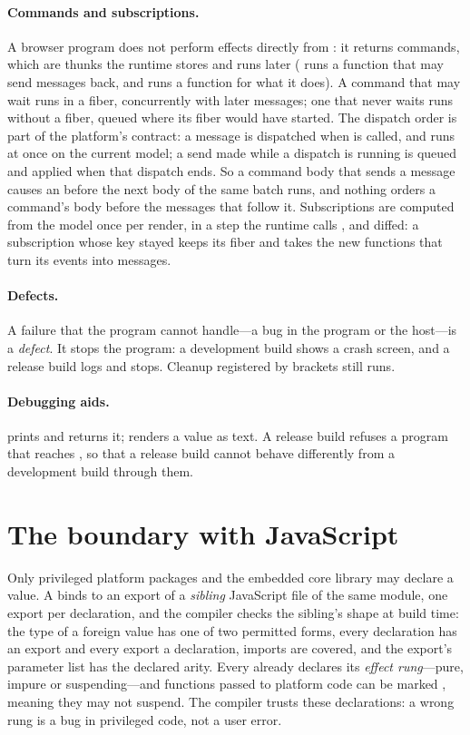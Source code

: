 \paragraph{Commands and subscriptions.} A browser program does not perform effects directly from
: it returns commands, which are thunks the runtime stores and runs later
( runs a function that may send messages back, and  runs a
function for what it does). A command that may wait runs in a fiber, concurrently with later
messages; one that never waits runs without a fiber, queued where its fiber would have started. The
dispatch order is part of the platform's contract: a message is dispatched when  is called,
and  runs at once on the current model; a send made while a dispatch is running is queued
and applied when that dispatch ends. So a command body that sends a message causes an 
before the next body of the same batch runs, and nothing orders a command's body before the messages
that follow it. Subscriptions are computed from the model once per render, in a step the runtime calls
, and diffed: a subscription whose key stayed keeps its fiber and takes the new functions
that turn its events into messages.

\paragraph{Defects.} A failure that the program cannot handle---a bug in the program or the host---is
a \emph{defect}. It stops the program: a development build shows a crash screen, and a release build
logs and stops. Cleanup registered by brackets still runs.

\paragraph{Debugging aids.}  prints  and returns it; 
renders a value as text. A release build refuses a program that reaches , so that a release
build cannot behave differently from a development build through them.

\section{The boundary with JavaScript}
\label{sec:bg-boundary}

Only privileged platform packages and the embedded core library may declare a  value.
A  binds to an export of a \emph{sibling} JavaScript file of the same module, one export
per declaration, and the compiler checks the sibling's shape at build time: the type of a foreign
value has one of two permitted forms, every declaration has an export and every export a declaration,
imports are covered, and the export's parameter list has the declared arity. Every 
already declares its \emph{effect rung}---pure, impure or suspending---and functions passed to
platform code can be marked , meaning they may not suspend. The compiler trusts these
declarations: a wrong rung is a bug in privileged code, not a user error.


